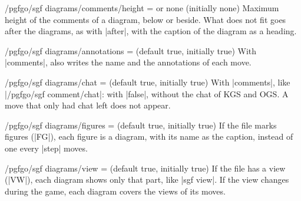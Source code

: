\begin{key}{/pgfgo/sgf diagrams/comments/height =  or none (initially none)}
	Maximum height of the comments of a diagram, below or beside. What does not fit goes after the diagrams, as with |after|, with the caption of the diagram as a heading.

	\begin{codeexample}
	\end{codeexample}
\end{key}

\begin{key}{/pgfgo/sgf diagrams/annotations =  (default true, initially true)}
	With |comments|, also writes the name and the annotations of each move.

	\begin{codeexample}
	\end{codeexample}

\end{key}

\begin{key}{/pgfgo/sgf diagrams/chat =  (default true, initially true)}
	With |comments|, like |/pgfgo/sgf comment/chat|: with |false|, without the chat of KGS and OGS. A move that only had chat left does not appear.
\end{key}

\begin{key}{/pgfgo/sgf diagrams/figures =  (default true, initially true)}
	If the file marks figures (|FG|), each figure is a diagram, with its name as the caption, instead of one every |step| moves.
\end{key}

\begin{key}{/pgfgo/sgf diagrams/view =  (default true, initially true)}
	If the file has a view (|VW|), each diagram shows only that part, like |sgf view|. If the view changes during the game, each diagram covers the views of its moves.
\end{key}

